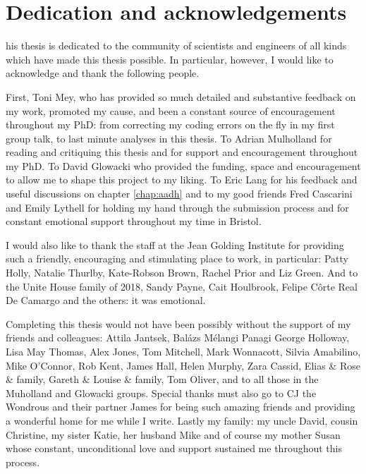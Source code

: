 %
%

\chapter*{Dedication and acknowledgements}
\begin{SingleSpace}
his thesis is dedicated to the community of scientists and engineers of all kinds which have made this thesis possible. In particular, however, I would like to acknowledge and thank the following people. 

First, Toni Mey, who has provided so much detailed and substantive feedback on my work, promoted my cause, and been a constant source of encouragement throughout my PhD: from correcting my coding errors on the fly in my first group talk, to last minute analyses in this thesis. To Adrian Mulholland for reading and critiquing this thesis and for support and encouragement throughout my PhD. To David Glowacki who provided the funding, space and encouragement to allow me to shape this project to my liking. To Eric Lang for his feedback and useful discussions on chapter \ref{chap:aadh} and to my good friends Fred Cascarini and Emily Lythell for holding my hand through the submission process and for constant emotional support throughout my time in Bristol.  

I would also like to thank the staff at the Jean Golding Institute for providing such a friendly, encouraging and stimulating place to work, in particular: Patty Holly, Natalie Thurlby, Kate-Robson Brown, Rachel Prior and Liz Green. And to the Unite House family of 2018, Sandy Payne, Cait Houlbrook, Felipe C\^{o}rte Real De Camargo and the others: it was emotional. 

Completing this thesis would not have been possibly without the support of my friends and colleagues: Attila Jantsek, Bal\'azs M\'{e}langi Panagi George Holloway, Lisa May Thomas, Alex Jones, Tom Mitchell, Mark Wonnacott, Silvia Amabilino, Mike O'Connor, Rob Kent, James Hall,  Helen Murphy, Zara Cassid, Elias \& Rose \& family, Gareth \& Louise \& family, Tom Oliver, and to all those in the Muholland and Glowacki groups. Special thanks must also go to CJ the Wondrous and their partner James for being such amazing friends and providing a wonderful home for me while I write. Lastly my family: my uncle David, cousin Christine, my sister Katie, her husband Mike and of course my mother Susan whose constant, unconditional love and support sustained me throughout this process. 

\end{SingleSpace}
\clearpage